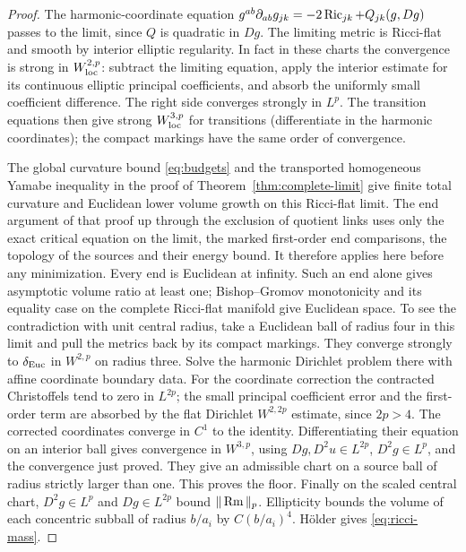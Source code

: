 \begin{proof}
The harmonic-coordinate equation
\(g^{ab}\partial_{ab}g_{jk}=-2\operatorname{Ric}_{jk}+Q_{jk}(g,Dg)\)
passes to the limit, since \(Q\) is quadratic in \(Dg\).
The limiting metric is Ricci-flat and smooth by interior elliptic
regularity. In fact in these charts the convergence is strong in
\(W^{2,p}_{\rm loc}\): subtract the limiting equation, apply the
interior estimate for its continuous elliptic principal coefficients,
and absorb the uniformly small coefficient difference. The right
side converges strongly in \(L^p\). The transition equations then
give strong \(W^{3,p}_{\rm loc}\) for transitions (differentiate in
the harmonic coordinates); the compact markings have the same order
of convergence.

The global curvature bound \eqref{eq:budgets} and the transported
homogeneous Yamabe inequality in the proof of
Theorem~\ref{thm:complete-limit} give finite total curvature and
Euclidean lower volume growth on this Ricci-flat limit. The end
argument of that proof up through the exclusion of quotient links
uses only the exact critical equation on the limit, the marked
first-order end comparisons, the topology of the sources and their
energy bound. It therefore applies here before any minimization.
Every end is Euclidean at infinity. Such an end alone gives
asymptotic volume ratio at least one; Bishop--Gromov monotonicity
and its equality case on the complete Ricci-flat manifold give
Euclidean space. To see the contradiction with unit central radius,
take a Euclidean ball of radius four in this limit and pull the
metrics back by its compact markings. They converge strongly to
\(\delta_{\rm Euc}\) in \(W^{2,p}\) on radius three. Solve the
harmonic Dirichlet problem there with affine coordinate boundary
data. For the coordinate correction the contracted Christoffels
tend to zero in \(L^{2p}\); the small principal coefficient error
and the first-order term are absorbed by the flat Dirichlet
\(W^{2,2p}\) estimate, since \(2p>4\). The corrected coordinates
converge in \(C^1\) to the identity. Differentiating their equation
on an interior ball gives convergence in \(W^{3,p}\), using
\(Dg,D^2u\in L^{2p}\), \(D^2g\in L^p\), and the convergence just
proved. They give an admissible chart on a source ball of radius
strictly larger than one. This proves the floor.
Finally on the scaled central chart, \(D^2g\in L^p\) and
\(Dg\in L^{2p}\) bound \(\|\operatorname{Rm}\|_p\). Ellipticity bounds the
volume of each concentric subball of radius \(b/a_i\) by
\(C(b/a_i)^4\). H\"older gives \eqref{eq:ricci-mass}.
\end{proof}

